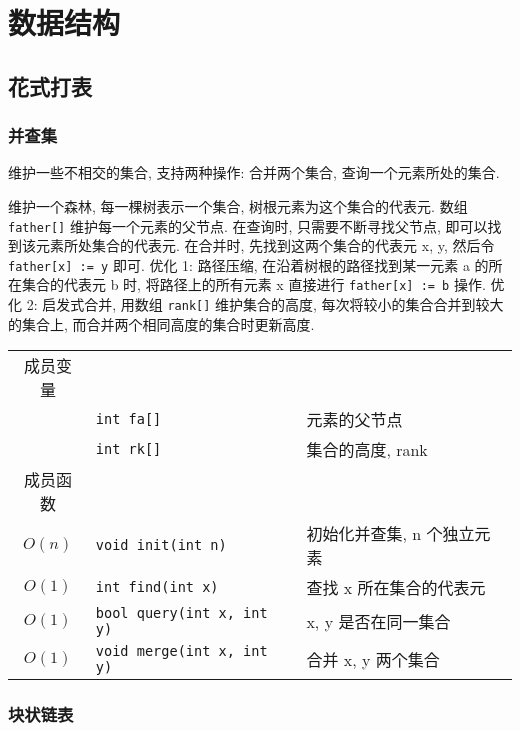 \chapter{数据结构}

% 
\section{花式打表}\small


	\subsection{并查集}\small
维护一些不相交的集合, 支持两种操作: 合并两个集合, 查询一个元素所处的集合.

维护一个森林, 每一棵树表示一个集合, 树根元素为这个集合的代表元. 数组
{\tt father[]} 维护每一个元素的父节点. 在查询时, 只需要不断寻找父节点, 即可以找
到该元素所处集合的代表元. 在合并时, 先找到这两个集合的代表元 x, y, 然后令
{\tt father[x] := y} 即可. 优化 1: 路径压缩, 在沿着树根的路径找到某一元素 a 的所
在集合的代表元 b 时, 将路径上的所有元素 x 直接进行 {\tt father[x] := b} 操作. 优
化 2: 启发式合并, 用数组 {\tt rank[]} 维护集合的高度, 每次将较小的集合合并到较大
的集合上, 而合并两个相同高度的集合时更新高度.

\begin{longtable}{|c|l|l|}
成员变量 & & \\
& \verb`int fa[]` & 元素的父节点 \\
& \verb`int rk[]` & 集合的高度, rank \\
成员函数 & & \\
$O(n)$ & \verb`void init(int n)` & 初始化并查集, n 个独立元素 \\
$O(1)$ & \verb`int find(int x)` & 查找 x 所在集合的代表元 \\
$O(1)$ & \verb`bool query(int x, int y)` & x, y 是否在同一集合 \\
$O(1)$ & \verb`void merge(int x, int y)` & 合并 x, y 两个集合 \\
\end{longtable}



	\subsection{块状链表}\small


